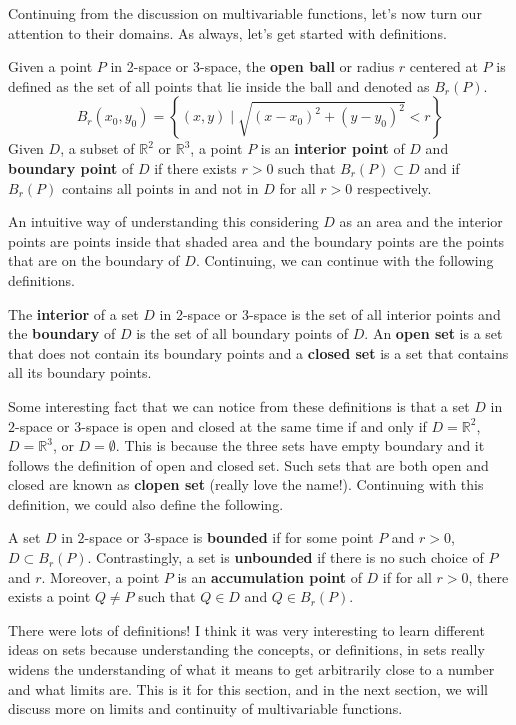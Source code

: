 \documentclass[../../../main.tex]{subfiles}
\begin{document}
Continuing from the discussion on multivariable functions, let's now
turn our attention to their domains. As always, let's get started with
definitions.

\begin{definition}{}{}
Given a point $P$ in 2-space or 3-space, the \textbf{open ball} or
radius $r$ centered at $P$ is defined as the set of all points that
lie inside the ball and denoted as $B_r(P)$.
\[
B_r (x_0, y_0)
= \left\{
    (x, y) \mid \sqrt{(x - x_0)^2 + (y - y_0)^2} < r
\right\}
\]
Given $D$, a subset of $\mathbb{R}^2$ or $\mathbb{R}^3$, a point $P$
is an \textbf{interior point} of $D$ and \textbf{boundary point} of
$D$ if there exists $r > 0$ such that $B_r(P) \subset D$ and if
$B_r(P)$ contains all points in and not in $D$ for all $r > 0$
respectively.
\end{definition}

An intuitive way of understanding this considering $D$ as an area
and the interior points are points inside that shaded area and the
boundary points are the points that are on the boundary of $D$.
Continuing, we can continue with the following definitions.

\begin{definition}{}{}
The \textbf{interior} of a set $D$ in 2-space or 3-space is the set of
all interior points and the \textbf{boundary} of $D$ is the set of all
boundary points of $D$. An \textbf{open set} is a set that does not
contain its boundary points and a \textbf{closed set} is a set that
contains all its boundary points.
\end{definition}

Some interesting fact that we can notice from these definitions is
that a set $D$ in $2$-space or $3$-space is open and closed at the
same time if and only if $D = \mathbb{R}^2$, $D = \mathbb{R}^3$,
or $D = \emptyset$. This is because the three sets have empty boundary
and it follows the definition of open and closed set. Such sets that
are both open and closed are known as \textbf{clopen set} (really love
the name!). Continuing with this definition, we could also define the
following.

\begin{definition}{}{}
A set $D$ in $2$-space or $3$-space is \textbf{bounded} if for some
point $P$ and $r > 0$, $D \subset B_r(P)$. Contrastingly, a set is
\textbf{unbounded} if there is no such choice of $P$ and $r$.
Moreover, a point $P$ is an \textbf{accumulation point} of $D$
if for all $r > 0$, there exists a point $Q \neq P$ such that
$Q \in D$ and $Q \in B_r(P)$.
\end{definition}

There were lots of definitions! I think it was very interesting
to learn different ideas on sets because understanding the concepts,
or definitions, in sets really widens the understanding of what it
means to get arbitrarily close to a number and what limits are.
This is it for this section, and in the next section, we will discuss
more on limits and continuity of multivariable functions.
\end{document}

